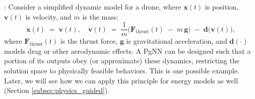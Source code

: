 :
Consider a simplified dynamic model for a drone, where $\mathbf{x}(t)$ is position, $\mathbf{v}(t)$ is velocity, and $m$ is the mass:
\begin{equation}
\label{eq:dynamics}
  \dot{\mathbf{x}}(t) \;=\; \mathbf{v}(t), 
  \quad
  \dot{\mathbf{v}}(t) \;=\; \frac{1}{m}\bigl(\mathbf{F}_{\text{thrust}}(t) \;-\; m\,\mathbf{g}\bigr)
  \;-\;\mathbf{d}\bigl(\mathbf{v}(t)\bigr),
\end{equation}
where $\mathbf{F}_{\text{thrust}}(t)$ is the thrust force, $\mathbf{g}$ is gravitational acceleration, and $\mathbf{d}(\cdot)$ models drag or other aerodynamic effects. A PgNN can be designed such that a portion of its outputs obey (or approximate) these dynamics, restricting the solution space to physically feasible behaviors. This is one possible example. Later, we will see how we can apply this principle for energy models as well (Section \ref{subsec:physics_guided}).




